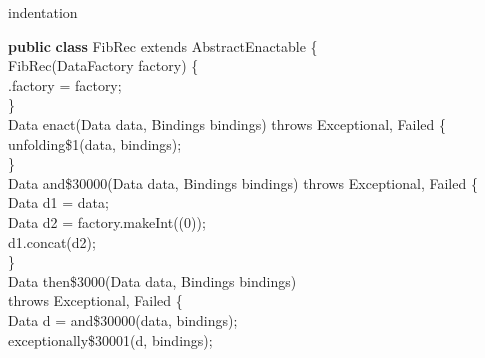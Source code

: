 %
%
\expandafter\ifx\csname indentation\endcsname\relax%
\newlength{\indentation}\fi
\setlength{\indentation}{0.5em}
\begin{flushleft}
{\bf public} {\bf class} FibRec extends AbstractEnactable \{\mbox{}\\
\hspace*{4\indentation}{\bf public} FibRec(DataFactory factory) \{\mbox{}\\
\hspace*{8\indentation}{\bf this}.factory = factory;\mbox{}\\
\hspace*{4\indentation}\}\mbox{}\\
\hspace*{4\indentation}{\bf public} Data enact(Data data, Bindings bindings) throws Exceptional, Failed \{\mbox{}\\
\hspace*{8\indentation}{\bf return} unfolding\$1(data, bindings);\mbox{}\\
\hspace*{4\indentation}\}\mbox{}\\
\hspace*{4\indentation}{\bf private} Data and\$30000(Data data, Bindings bindings) throws Exceptional, Failed \{\mbox{}\\
\hspace*{8\indentation}Data d1 = data;\mbox{}\\
\hspace*{8\indentation}Data d2 = factory.makeInt((0));\mbox{}\\
\hspace*{8\indentation}{\bf return} d1.concat(d2);\mbox{}\\
\hspace*{4\indentation}\}\mbox{}\\
\hspace*{4\indentation}{\bf private} Data then\$3000(Data data, Bindings bindings)\mbox{}\\
\hspace*{8\indentation}throws Exceptional, Failed \{\mbox{}\\
\hspace*{8\indentation}Data d = and\$30000(data, bindings);\mbox{}\\
\hspace*{8\indentation}{\bf return} exceptionally\$30001(d, bindings);\mbox{}\\

\end{flushleft}
